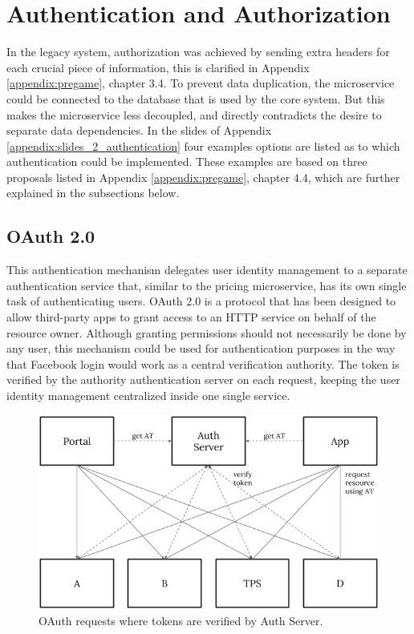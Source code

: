 \section{Authentication and Authorization}
In the legacy system, authorization was achieved by sending extra headers for each crucial piece of information, this is clarified in Appendix \ref{appendix:pregame}, chapter 3.4. To prevent data duplication, the microservice could be connected to the database that is used by the core system. But this makes the microservice less decoupled, and directly contradicts the desire to separate data dependencies. In the slides of Appendix \ref{appendix:slides_2_authentication} four examples options are listed as to which authentication could be implemented. These examples are based on three proposals listed in Appendix \ref{appendix:pregame}, chapter 4.4, which are further explained in the subsections below.

\subsection{OAuth 2.0}
This authentication mechanism delegates user identity management to a separate authentication service that, similar to the pricing microservice, has its own single task of authenticating users. OAuth 2.0 is a protocol that has been designed to allow third-party apps to grant access to an HTTP service on behalf of the resource owner. Although granting permissions should not necessarily be done by any user, this mechanism could be used for authentication purposes in the way that Facebook login would work as a central verification authority. The token is verified by the authority authentication server on each request, keeping the user identity management centralized inside one single service.

\begin{figure}[H]
	\centering
	\includegraphics[width=.7\textwidth]{Auth1}
	\caption[OAuth 2.0]{OAuth requests where tokens are verified by Auth Server.}
	\label{fig:Auth1}
\end{figure}

